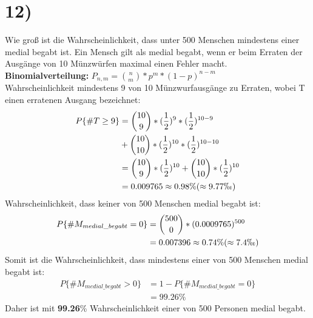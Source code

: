 \documentclass[11pt,a4paper]{article}
\begin{document}
  \newpage
  \section*{12)}

    Wie groß ist die Wahrscheinlichkeit, dass unter 500 Menschen mindestens einer medial begabt ist. Ein Mensch gilt als medial begabt, wenn er beim Erraten der Ausgänge von 10 Münzwürfen maximal einen Fehler macht.\\
    \newline
    \textbf{Binomialverteilung:} $ P_{n,m} = \binom{n}{m} * p^m * (1-p)^{n-m} $ \\
    \newline
    Wahrscheinlichkeit mindestens 9 von 10 Münzwurfausgänge zu Erraten, wobei T einen erratenen Ausgang bezeichnet:
    \begin{equation}
      \begin{split}
        P\{ \# T \geq 9 \} & = \binom{10}{9} * (\frac{1}{2})^9 * (\frac{1}{2})^{10-9} \\
        & + \binom{10}{10} * (\frac{1}{2})^{10} * (\frac{1}{2})^{10-10} \\
        & = \binom{10}{9} * (\frac{1}{2})^{10} + \binom{10}{10} * (\frac{1}{2})^{10} \\
        & = 0.009765 \approx 0.98\% (\approx 9.77 \permil )
      \end{split}
    \end{equation}
    Wahrscheinlichkeit, dass keiner von 500 Menschen medial begabt ist:
    \begin{equation}
      \begin{split}
        P\{ \# M_{medial\_ begabt} = 0 \} & = \binom{500}{0} * (0.0009765)^{500} \\
        & = 0.007396 \approx 0.74\% (\approx 7.4 \permil )
      \end{split}
    \end{equation}
    Somit ist die Wahrscheinlichkeit, dass mindestens einer von 500 Menschen medial begabt ist:
    \begin{equation}
      \begin{split}
        P\{ \# M_{medial\_ begabt} > 0 \} & = 1 - P\{ \# M_{medial\_ begabt} = 0 \} \\
        & = 99.26\%
      \end{split}
    \end{equation}
    Daher ist mit \textbf{99.26}\% Wahrscheinlichkeit einer von 500 Personen medial begabt.
\end{document}
